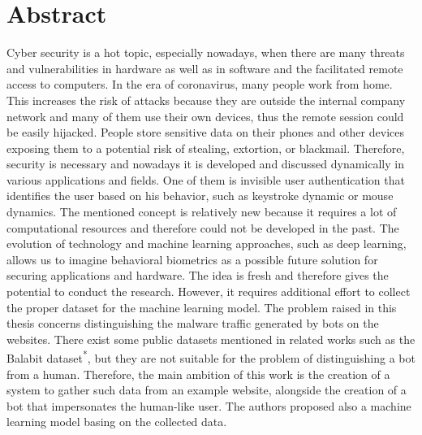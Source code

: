 \section{Abstract}\label{sec:abstract}
Cyber security is a hot topic, especially nowadays, when there are many threats and vulnerabilities in hardware as well as in software and the facilitated remote access to computers.
In the era of coronavirus, many people work from home.
This increases the risk of attacks because they are outside the internal company network and many of them use their own devices, thus the remote session could be easily hijacked.
People store sensitive data on their phones and other devices exposing them to a potential risk of stealing, extortion, or blackmail.
Therefore, security is necessary and nowadays it is developed and discussed dynamically in various applications and fields.
One of them is invisible user authentication that identifies the user based on his behavior, such as keystroke dynamic or mouse dynamics.
The mentioned concept is relatively new because it requires a lot of computational resources and therefore could not be developed in the past.
The evolution of technology and machine learning approaches, such as deep learning, allows us to imagine behavioral biometrics as a possible future solution for securing applications and hardware.
The idea is fresh and therefore gives the potential to conduct the research.
However, it requires additional effort to collect the proper dataset for the machine learning model.
The problem raised in this thesis concerns distinguishing the malware traffic generated by bots on the websites.
There exist some public datasets mentioned in related works such as the Balabit dataset\textsuperscript{*}, but they are not suitable for the problem of distinguishing a bot from a human.
Therefore, the main ambition of this work is the creation of a system to gather such data from an example website, alongside the creation of a bot that impersonates the human-like user.
The authors proposed also a machine learning model basing on the collected data.

